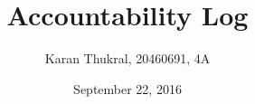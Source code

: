 \documentclass[12pt]{article}
\title{Accountability Log}
\author{Karan Thukral, 20460691, 4A}
\date{September 22, 2016}
\begin{document}
	\makereporttitle
	
\end{document}
